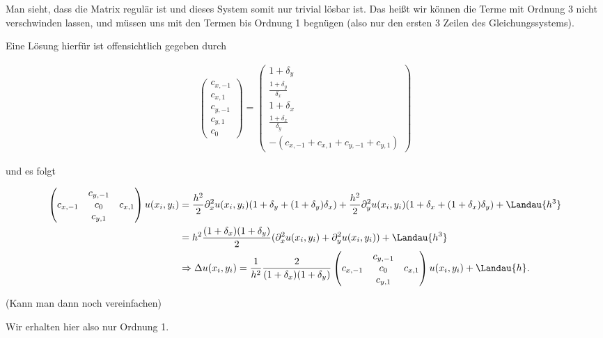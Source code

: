 \begin{solution}
  Man sieht, dass die Matrix regulär ist und dieses System somit nur trivial lösbar ist.
  Das heißt wir können die Terme mit Ordnung 3 nicht verschwinden lassen, und müssen uns mit den Termen bis Ordnung 1 begnügen (also nur den ersten 3 Zeilen des Gleichungssystems).

  Eine Lösung hierfür ist offensichtlich gegeben durch

  \begin{align*}
  \begin{pmatrix}
  c_{x,-1} \\
  c_{x,1} \\
  c_{y,-1} \\
  c_{y,1} \\
  c_{0}
  \end{pmatrix} =
  \begin{pmatrix}
    1+\delta_y \\ \frac{1+\delta_y}{\delta_x} \\ 1+\delta_x \\ \frac{1+\delta_x}{\delta_y} \\ -(c_{x,-1}+ c_{x,1} + c_{y,-1} + c_{y,1})
  \end{pmatrix}
  \end{align*}

  und es folgt

  \begin{align*}
  \begin{pmatrix}
  & c_{y,-1} &\\
  c_{x,-1} & c_0 & c_{x,1}\\
  & c_{y,1} &
  \end{pmatrix}
  u(x_i,y_i) &= \frac{h^2}{2}\partial_x^2u(x_i,y_i)(1 + \delta_y + (1+\delta_y)\delta_x ) +\frac{h^2}{2}\partial_y^2 u(x_i,y_i)(1 + \delta_x + (1 + \delta_x)\delta_y) + \Landau{h^3} \\
  &= h^2 \frac{(1 + \delta_x)(1 + \delta_y)}{2} (\partial_x^2 u(x_i,y_i) + \partial_y^2 u(x_i,y_i)) + \Landau{h^3} \\
  &\Rightarrow \Delta u(x_i,y_i) = \frac{1}{h^2} \frac{2}{(1 + \delta_x)(1 + \delta_y)} \begin{pmatrix}
  & c_{y,-1} &\\
  c_{x,-1} & c_0 & c_{x,1}\\
  & c_{y,1} &
  \end{pmatrix} u(x_i,y_i) + \Landau{h}.
  \end{align*}

  (Kann man dann noch vereinfachen)

  Wir erhalten hier also nur Ordnung 1.
\end{solution}
